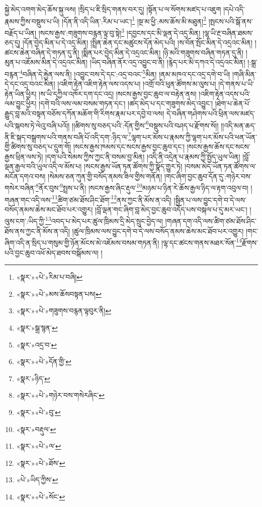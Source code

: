 སྐྱེ་མེད་འགག་མེད་ཆོས་སྐུ་ལས། །སྲིད་པ་ཇི་སྲིད་གནས་བར་དུ། །སྟོན་པ་ལ་སོགས་མཛད་པ་འཇུག །དཔེ་འདི་རྣམས་ཀྱིས་བསྡུས་པ་ཡི། །དོན་ནི་འདི་ཡིན་:རིམ་པ་ཡང་།\footnote{«སྣར་»«པེ་»རིམ་པ་བཞི།} །སྔ་མ་ཕྱི་:མས་ཆོས་མི་མཐུན།\footnote{«སྣར་»«པེ་»མས་ཆོསབསྟན་པས།} །སྤངས་པའི་སྒོ་ནས་བརྗོད་པ་ཡིན། །སངས་རྒྱས་:གཟུགས་བརྙན་ལྟ་བུ་སྟེ།\footnote{«སྣར་»«པེ་»གཟུགས་བརྙན་ལྟབུར་ནི།} །དབྱངས་དང་མི་ལྡན་དེ་འདྲ་མིན། །ལྷ་ཡི་རྔ་བཞིན་ཐམས་ཅད་དུ། །དོན་བྱེད་མིན་པ་དེ་འདྲ་མིན། །སྤྲིན་ཆེན་དང་མཚུངས་དོན་མེད་པའི། །ས་བོན་སྤོང་མིན་དེ་འདྲའང་མིན། །ཚངས་ཆེན་བཞིན་དེ་གཏན་དུ་ནི། །སྨིན་པར་བྱེད་མིན་དེ་འདྲའང་མིན། །ཉི་མའི་གཟུགས་བཞིན་གཏན་དུ་ནི། །མུན་པ་འཇོམས་མིན་དེ་འདྲའང་མིན། །ཡིད་བཞིན་ནོར་འདྲ་འབྱུང་བ་ནི། །རྙེད་པར་མི་དཀའ་དེ་འདྲའང་མིན། །:སྒྲ་བརྙན་\footnote{«སྣར་»སྒྲ་སྙན་}བཞིན་དེ་རྐྱེན་ལས་ནི། །འབྱུང་བས་དེ་དང་:འདྲ་བའང་\footnote{«སྣར་»འདྲ་བ་}མིན། །ནམ་མཁའ་དང་འདྲ་དགེ་བ་ཡི། །གཞི་མིན་དེ་དང་འདྲ་བའང་མིན། །འཇིག་རྟེན་འཇིག་རྟེན་ལས་འདས་པ། །འགྲོ་བའི་ཕུན་ཚོགས་མ་ལུས་པ། །དེ་གནས་པ་ཡི་རྟེན་ཡིན་ཕྱིར། །ས་ཡི་དཀྱིལ་འཁོར་དག་དང་འདྲ། །སངས་རྒྱས་བྱང་ཆུབ་ལ་བརྟེན་ནས། །འཇིག་རྟེན་འདས་པའི་ལམ་བྱུང་ཕྱིར། །དགེ་བའི་ལས་ལམ་བསམ་གཏན་དང་། །ཚད་མེད་པ་དང་གཟུགས་མེད་འབྱུང་། །ཐེག་པ་ཆེན་པོ་རྒྱུད་བླ་མའི་བསྟན་བཅོས་དཀོན་མཆོག་གི་རིགས་རྣམ་པར་དབྱེ་བ་ལས། དེ་བཞིན་གཤེགས་པའི་ཕྲིན་ལས་མཛད་པའི་སྐབས་ཏེ་ལེའུ་བཞི་པའོ།། །།ཚིགས་སུ་བཅད་པའི་:དོན་གྱིས་\footnote{«སྣར་»«པེ་»དོན་གྱི་}བསྡུས་པའི་བཤད་པ་རྫོགས་སོ།། །།འདི་མན་ཆད་ནི་ཇི་སྐད་བསྒྲགས་པའི་གནས་བཞི་པོ་འདི་དག་:ཉིད་ལ་\footnote{«སྣར་»ཉིད་}ལྷག་པར་མོས་པ་རྣམས་ཀྱི་ལྷག་པར་མོས་པའི་ཕན་ཡོན་གྱི་ཚིགས་སུ་བཅད་པ་དྲུག་གོ། །སངས་རྒྱས་ཁམས་དང་སངས་རྒྱས་བྱང་ཆུབ་དང་། །སངས་རྒྱས་ཆོས་དང་སངས་རྒྱས་ཕྲིན་ལས་ཏེ། །དག་པའི་སེམས་ཀྱིས་ཀྱང་ནི་བསམ་བྱ་མིན། །འདི་ནི་འདྲེན་པ་རྣམས་ཀྱི་སྤྱོད་ཡུལ་ཡིན། །བློ་ལྡན་རྒྱལ་བའི་ཡུལ་འདི་ལ་མོས་པ། །སངས་རྒྱས་ཡོན་ཏན་ཚོགས་ཀྱི་སྣོད་གྱུར་ཏེ། །བསམ་མེད་ཡོན་ཏན་ཚོགས་ལ་མངོན་དགའ་བས། །སེམས་ཅན་ཀུན་གྱི་བསོད་ནམས་ཟིལ་གྱིས་གནོན། །གང་ཞིག་བྱང་ཆུབ་དོན་དུ་:གཉེར་བས་གསེར་བཞིན་\footnote{«སྣར་»«པེ་»གཉེར་བས་གསེརཞིང་}ནོར་བུས་\footnote{«སྣར་»«པེ་»བུ་}སྤྲས་པ་ནི། །སངས་རྒྱས་ཞིང་རྡུལ་\footnote{«སྣར་»བརྡུལ་}མཉམ་པ་ཉིན་རེ་ཆོས་རྒྱལ་ཉིད་ལ་རྟག་འབུལ་བ། །གཞན་གང་འདི་ལས་\footnote{«སྣར་»«པེ་»ལ་}ཚིག་ཙམ་ཐོས་ཤིང་ཐོག་\footnote{«སྣར་»«པེ་»ཐོས་}ནས་ཀྱང་ནི་མོས་ན་འདི། །སྦྱིན་པ་ལས་བྱུང་དགེ་བ་དེ་ལས་བསོད་ནམས་ཆེས་མང་ཐོབ་པར་འགྱུར། །བློ་ལྡན་གང་ཞིག་བླ་མེད་བྱང་ཆུབ་འདོད་པས་བསྐལ་པ་དུ་མར་ཡང་། །ལུས་ངག་:ཡིད་ཀྱི་\footnote{«པེ་»ཡིད་ཀྱིས་}འབད་པ་མེད་པར་ཚུལ་ཁྲིམས་དྲི་མེད་སྲུང་བྱེད་ལ། །གཞན་དག་འདི་ལས་ཚིག་ཙམ་ཐོས་ཤིང་ཐོས་ནས་ཀྱང་ནི་མོས་ན་འདི། །ཚུལ་ཁྲིམས་ལས་བྱུང་དགེ་བ་དེ་ལས་བསོད་ནམས་ཆེས་མང་ཐོབ་པར་འགྱུར། །གང་ཞིག་འདི་ན་སྲིད་པ་གསུམ་གྱི་ཉོན་མོངས་མེ་འཇོམས་བསམ་གཏན་ནི། །ལྷ་དང་ཚངས་གནས་མཐར་སོན་\footnote{«སྣར་»«པེ་»སོང་}རྫོགས་པའི་བྱང་ཆུབ་འཕོ་མེད་ཐབས་བསྒོམས་ལ། །
